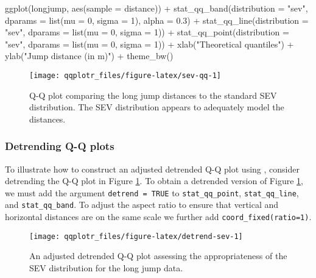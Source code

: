 \begin{Schunk}
\begin{Sinput}
ggplot(longjump, aes(sample = distance)) +
  stat_qq_band(distribution = "sev", dparams = list(mu = 0, sigma = 1), 
               alpha = 0.3) +
  stat_qq_line(distribution = "sev", dparams = list(mu = 0, sigma = 1)) +
  stat_qq_point(distribution = "sev", dparams = list(mu = 0, sigma = 1)) +
  xlab("Theoretical quantiles") +
  ylab("Jump distance (in m)") +
  theme_bw()
\end{Sinput}
\begin{figure}

{\centering \texttt{[image: qqplotr\_files/figure-latex/sev-qq-1]} 

}

\caption[Q-Q plot comparing the long jump distances to the standard SEV distribution]{Q-Q plot comparing the long jump distances to the standard SEV distribution. The SEV distribution appears to adequately model the distances.}\label{fig:sev-qq}
\end{figure}
\end{Schunk}

\subsubsection{Detrending Q-Q plots}\label{detrending-q-q-plots}

\label{sec:detrending}

To illustrate how to construct an adjusted detrended Q-Q plot using
, consider detrending the Q-Q plot in Figure
\ref{fig:sev-qq}. To obtain a detrended version of Figure
\ref{fig:sev-qq}, we must add the argument \texttt{detrend\ =\ TRUE} to
\texttt{stat\_qq\_point}, \texttt{stat\_qq\_line}, and
\texttt{stat\_qq\_band}. To adjust the aspect ratio to ensure that
vertical and horizontal distances are on the same scale we further add
\texttt{coord\_fixed(ratio=1)}.

\begin{Schunk}
\begin{figure}

{\centering \texttt{[image: qqplotr\_files/figure-latex/detrend-sev-1]} 

}

\caption[An adjusted detrended Q-Q plot assessing the appropriateness of the SEV distribution for the long jump data]{An adjusted detrended Q-Q plot assessing the appropriateness of the SEV distribution for the long jump data.}\label{fig:detrend-sev}
\end{figure}
\end{Schunk}

